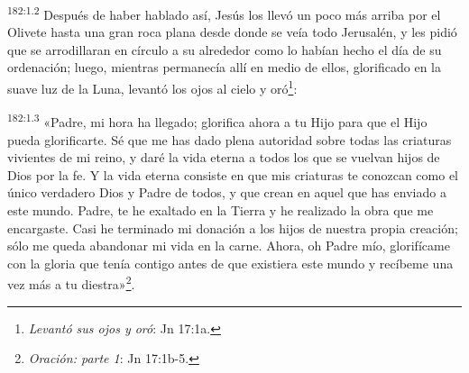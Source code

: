 \par
\textsuperscript{182:1.2} Después de haber hablado así, Jesús los llevó un poco más arriba por el Olivete hasta una gran roca plana desde donde se veía todo Jerusalén, y les pidió que se arrodillaran en círculo a su alrededor como lo habían hecho el día de su ordenación; luego, mientras permanecía allí en medio de ellos, glorificado en la suave luz de la Luna, levantó los ojos al cielo y oró\footnote{\textit{Levantó sus ojos y oró}: Jn 17:1a.}:

\par
\textsuperscript{182:1.3} «Padre, mi hora ha llegado; glorifica ahora a tu Hijo para que el Hijo pueda glorificarte. Sé que me has dado plena autoridad sobre todas las criaturas vivientes de mi reino, y daré la vida eterna a todos los que se vuelvan hijos de Dios por la fe. Y la vida eterna consiste en que mis criaturas te conozcan como el único verdadero Dios y Padre de todos, y que crean en aquel que has enviado a este mundo. Padre, te he exaltado en la Tierra y he realizado la obra que me encargaste. Casi he terminado mi donación a los hijos de nuestra propia creación; sólo me queda abandonar mi vida en la carne. Ahora, oh Padre mío, glorifícame con la gloria que tenía contigo antes de que existiera este mundo y recíbeme una vez más a tu diestra»\footnote{\textit{Oración: parte 1}: Jn 17:1b-5.}.

